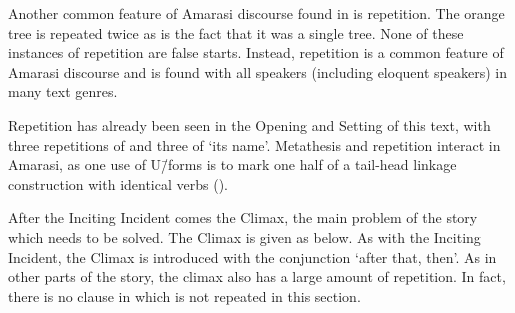 Another common feature of Amarasi discourse found in 
 is repetition.
The orange tree is repeated twice as is the fact that it was a single tree.
None of these instances of repetition are false starts.
Instead, repetition is a common feature of Amarasi discourse
and is found with all speakers (including eloquent speakers) in many text genres.

Repetition has already been seen in
the Opening 
and Setting  of this text,
with three repetitions of 
and three of  `its name'.
Metathesis and repetition interact in Amarasi,
as one use of U\=/forms is to mark
one half of a tail-head linkage construction
with identical verbs ().

After the Inciting Incident comes the Climax,
the main problem of the story which needs to be solved.
The Climax is given as  below.
As with the Inciting Incident, the Climax
is introduced with the conjunction  `after that, then'.
As in other parts of the story, the climax also has a large
amount of repetition. %
In fact, there is no clause in 
which is not repeated in this section.

